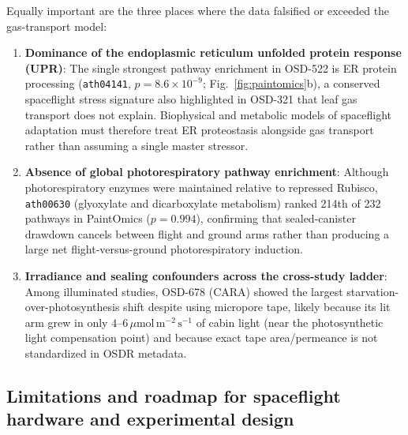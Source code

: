 \documentclass[final,5p,times,twocolumn,numbers,sort&compress]{elsarticle}
\newcommand{\ums}{\ensuremath{\mu\mathrm{mol\,m^{-2}\,s^{-1}}}}
\begin{document}
Equally important are the three places where the data falsified or exceeded the gas-transport model:
\begin{enumerate}
    \item \textbf{Dominance of the endoplasmic reticulum unfolded protein response (UPR)}: The single strongest pathway enrichment in OSD-522 is ER protein processing (\texttt{ath04141}, $p = 8.6\times 10^{-9}$; Fig.~\ref{fig:paintomics}b), a conserved spaceflight stress signature also highlighted in OSD-321 \citep{osd321} that leaf gas transport does not explain. Biophysical and metabolic models of spaceflight adaptation must therefore treat ER proteostasis alongside gas transport rather than assuming a single master stressor.
    \item \textbf{Absence of global photorespiratory pathway enrichment}: Although photorespiratory enzymes were maintained relative to repressed Rubisco, \texttt{ath00630} (glyoxylate and dicarboxylate metabolism) ranked 214th of 232 pathways in PaintOmics ($p = 0.994$), confirming that sealed-canister drawdown cancels between flight and ground arms rather than producing a large net flight-versus-ground photorespiratory induction.
    \item \textbf{Irradiance and sealing confounders across the cross-study ladder}: Among illuminated studies, OSD-678 (CARA) showed the largest starvation-over-photosynthesis shift despite using micropore tape, likely because its lit arm grew in only $4\text{--}6\,\ums$ of cabin light (near the photosynthetic light compensation point) and because exact tape area/permeance is not standardized in OSDR metadata.
\end{enumerate}

\subsection{Limitations and roadmap for spaceflight hardware and experimental design}
\end{document}
